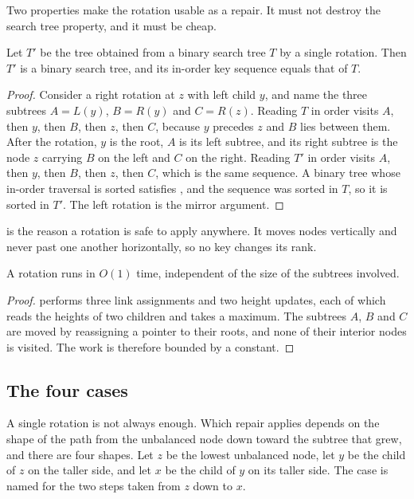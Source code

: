 Two properties make the rotation usable as a repair. It must not destroy the
search tree property, and it must be cheap.

\begin{lemma}
\label{lem:inorder}
Let $T'$ be the tree obtained from a binary search tree $T$ by a single rotation.
Then $T'$ is a binary search tree, and its in-order key sequence equals that of
$T$.
\end{lemma}

\begin{proof}
Consider a right rotation at $z$ with left child $y$, and name the three subtrees
$A = L(y)$, $B = R(y)$ and $C = R(z)$. Reading $T$ in order visits $A$, then $y$,
then $B$, then $z$, then $C$, because $y$ precedes $z$ and $B$ lies between them.
After the rotation, $y$ is the root, $A$ is its left subtree, and its right
subtree is the node $z$ carrying $B$ on the left and $C$ on the right. Reading
$T'$ in order visits $A$, then $y$, then $B$, then $z$, then $C$, which is the
same sequence. A binary tree whose in-order traversal is sorted satisfies
, and the sequence was sorted in $T$, so it is sorted in $T'$. The
left rotation is the mirror argument.
\end{proof}

 is the reason a rotation is safe to apply anywhere. It moves
nodes vertically and never past one another horizontally, so no key changes its
rank.

\begin{lemma}
\label{lem:rotcost}
A rotation runs in $O(1)$ time, independent of the size of the subtrees involved.
\end{lemma}

\begin{proof}
 performs three link assignments and two height updates, each of
which reads the heights of two children and takes a maximum. The subtrees $A$,
$B$ and $C$ are moved by reassigning a pointer to their roots, and none of their
interior nodes is visited. The work is therefore bounded by a constant.
\end{proof}

\subsection{The four cases}

A single rotation is not always enough. Which repair applies depends on the shape
of the path from the unbalanced node down toward the subtree that grew, and there
are four shapes. Let $z$ be the lowest unbalanced node, let $y$ be the child of
$z$ on the taller side, and let $x$ be the child of $y$ on its taller side. The
case is named for the two steps taken from $z$ down to $x$.

